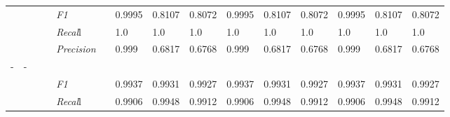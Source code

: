 \begin{table}[]
\begin{tabularx}{\textwidth}{XXlllllllllllll@{}}
                                                                    &                                                                     &                                                           &    & \textit{F1} &                                                      & 0.9995        & 0.8107        & 0.8072        & 0.9995        & 0.8107        & 0.8072        & 0.9995        & 0.8107        & 0.8072        \\
                                                                    &                                                                     &                                                           &    & \textit{Recal}l &                                                      & 1.0    & 1.0    & 1.0    & 1.0    & 1.0    & 1.0    & 1.0    & 1.0    & 1.0    \\
                                                                    &                                                                     &                                                           &    & \textit{Precision} &                                                      & 0.999 & 0.6817 & 0.6768 & 0.999 & 0.6817 & 0.6768 & 0.999 & 0.6817 & 0.6768 \\ \midrule
- & - &  &  &                                                              &                                                                   &                                                             &                                                               &                                                                    &                                                              &                                                               &                                                                    &                                                              \\
                                                                    &                                                                     &                                                           &    & \textit{F1} &                                                      & 0.9937        & 0.9931        & 0.9927        & 0.9937        & 0.9931        & 0.9927        & 0.9937        & 0.9931        & 0.9927        \\
                                                                    &                                                                     &                                                           &    & \textit{Recal}l &                                                      & 0.9906    & 0.9948    & 0.9912    & 0.9906    & 0.9948    & 0.9912    & 0.9906    & 0.9948    & 0.9912    \\

\end{tabularx}
\end{table}
